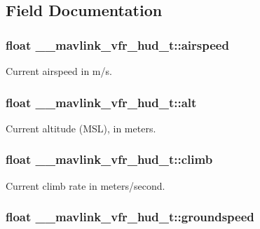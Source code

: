 \subsection{Field Documentation}
\hypertarget{struct____mavlink__vfr__hud__t_a78714d39e0dd6db7448c6633442a9e00}{
\subsubsection[{airspeed}]{\setlength{\rightskip}{0pt plus 5cm}float \+\_\+\+\_\+mavlink\+\_\+vfr\+\_\+hud\+\_\+t\+::airspeed}}\label{struct____mavlink__vfr__hud__t_a78714d39e0dd6db7448c6633442a9e00}


Current airspeed in m/s. 

\hypertarget{struct____mavlink__vfr__hud__t_a7a6c968281e1518a001e32e24424a8da}{
\subsubsection[{alt}]{\setlength{\rightskip}{0pt plus 5cm}float \+\_\+\+\_\+mavlink\+\_\+vfr\+\_\+hud\+\_\+t\+::alt}}\label{struct____mavlink__vfr__hud__t_a7a6c968281e1518a001e32e24424a8da}


Current altitude (M\+S\+L), in meters. 

\hypertarget{struct____mavlink__vfr__hud__t_a3b87f500e3394aef4c26d05435f1e7ba}{
\subsubsection[{climb}]{\setlength{\rightskip}{0pt plus 5cm}float \+\_\+\+\_\+mavlink\+\_\+vfr\+\_\+hud\+\_\+t\+::climb}}\label{struct____mavlink__vfr__hud__t_a3b87f500e3394aef4c26d05435f1e7ba}


Current climb rate in meters/second. 

\hypertarget{struct____mavlink__vfr__hud__t_aecadd708f2c0aee3193f00bd22711730}{
\subsubsection[{groundspeed}]{\setlength{\rightskip}{0pt plus 5cm}float \+\_\+\+\_\+mavlink\+\_\+vfr\+\_\+hud\+\_\+t\+::groundspeed}}\label{struct____mavlink__vfr__hud__t_aecadd708f2c0aee3193f00bd22711730}


